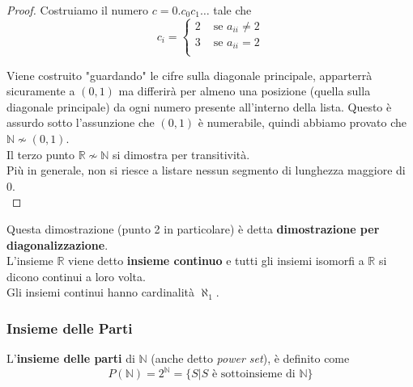 \begin{proof}
	Costruiamo il numero $c = 0.c_0 c_1 \dots$ tale che
	$$ c_{i} = \begin{cases}
		2 & \text{ se } a_{ii} \neq 2 \\
		3 & \text{ se } a_{ii} = 2 \\
	\end{cases}$$
	
	Viene costruito "guardando" le cifre sulla diagonale principale, apparterrà sicuramente a $(0,1)$ ma differirà per almeno una posizione (quella sulla diagonale principale) da ogni numero presente all'interno della lista. Questo è assurdo sotto l'assunzione che $(0,1)$ è numerabile, quindi abbiamo provato che $\mathbb{N} \nsim (0,1)$.\\
	
	Il terzo punto $\mathbb{R} \nsim \mathbb{N}$ si dimostra per transitività.\\
	
	Più in generale, non si riesce a listare nessun segmento di lunghezza maggiore di 0.\\
\end{proof}

Questa dimostrazione (punto 2 in particolare) è detta \textbf{dimostrazione per diagonalizzazione}.\\

L'insieme $\mathbb{R}$ viene detto \textbf{insieme continuo} e tutti gli insiemi isomorfi a $\mathbb{R}$ si dicono continui a loro volta.\\

Gli insiemi continui hanno cardinalità $\aleph_1$.\\

\subsubsection{Insieme delle Parti}
L'\textbf{insieme delle parti} di $\mathbb{N}$ (anche detto \textit{power set}), è definito come
$$ P(\mathbb{N}) = 2^{\mathbb{N}} = \{S | S \text{ è sottoinsieme di } \mathbb{N}\} $$

